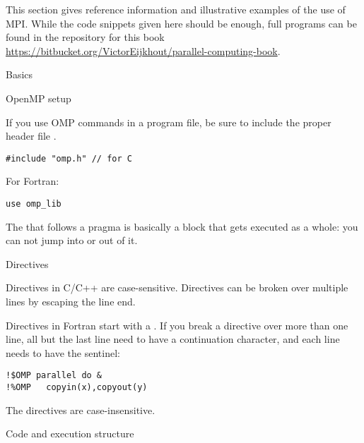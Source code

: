
This section gives reference information and illustrative examples
of the use of MPI. While the code snippets given here should be enough,
full programs can be found in the repository for this book
\url{https://bitbucket.org/VictorEijkhout/parallel-computing-book}.

 {Basics}

 {OpenMP setup}

If you use OMP commands in a program file, be sure to include
the proper header file .
\begin{verbatim}
#include "omp.h" // for C
\end{verbatim}

For Fortran:
\begin{verbatim}
use omp_lib
\end{verbatim}
The  that follows a pragma is basically a block 
that gets executed as a whole: you can not jump into or out of it.

 {Directives}

Directives in C/C++ are case-sensitive. Directives can be broken over
multiple lines by escaping the line end.

Directives in Fortran start with a .
If you break a directive over more than one line, all but the last line
need to have a continuation character, and each line needs to have the sentinel:
\begin{verbatim}
!$OMP parallel do &
!%OMP   copyin(x),copyout(y)
\end{verbatim}
The directives are case-insensitive.


 {Code and execution structure}

